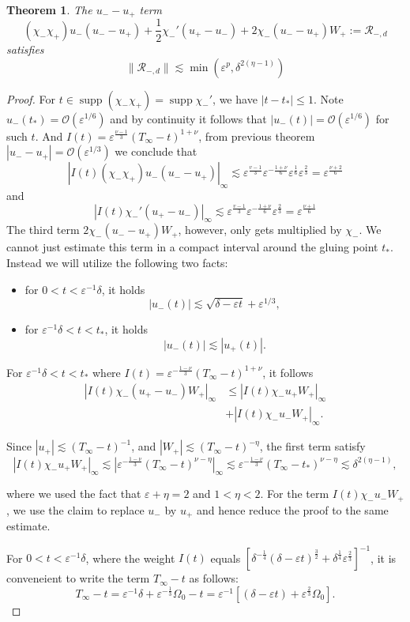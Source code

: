 \documentclass[letterpaper,11pt]{article}
\newcommand{\rmO}{\mathcal{O}}
\newcommand{\eps}{\varepsilon}
\newcommand{\lar}{ \lesssim }
\newcommand{\supp}{\operatorname{supp}}
\numberwithin{equation}{section}
\theoremstyle{plain}
\newtheorem{theorem}{Theorem}[section]
\begin{document}
\begin{enumerate}
\begin{itemize}
\begin{enumerate}
\begin{theorem}
The $u_--u_+$ term
\[
  (\chi_-\chi_+)u_-(u_--u_+) +\frac{1}{2}\chi_-'(u_+-u_-) + 2\chi_-(u_- -u_+)W_+ := \mathcal{R}_{-,d}
\]
satisfies
\[
\| \mathcal{R}_{-,d} \| \lar \min(\eps^{p}, \delta^{2(\eta-1)} )
\]
\end{theorem}
\begin{proof}
For $t\in \supp (\chi_-\chi_+) = \supp \chi_-'$, we have $|t-t_*| \le 1$. Note $u_-(t_*) = \rmO(\eps^{1/6})$ and by continuity it follows that $|u_-(t)| = \rmO(\eps^{1/6})$ for such $t$. And $I(t)=\eps^{\frac{\nu-1}{3}}(T_\infty-t)^{1+\nu}$, from previous theorem $|u_- - u_+| = \rmO(\eps^{1/3})$ we conclude that
\[
|I(t) (\chi_-\chi_+)u_-(u_--u_+)|_\infty \lar \eps^{\frac{v-1}{3}} \eps^{-\frac{1+\nu}{6}} \eps^{\frac{1}{6}}\eps^{\frac{2}{3}} = \eps^{\frac{\nu+2}{6}}
\]
 and
\[
|I(t) \chi_-'(u_+-u_-) |_\infty \lar\eps^{\frac{v-1}{3}} \eps^{-\frac{1+\nu}{6}} \eps^{\frac{2}{3}} = \eps^{\frac{\nu+1}{6}}
\]
 The third term $2\chi_-(u_- -u_+)W_+$, however, only gets multiplied by $\chi_-$. We cannot just estimate this term in a compact interval around the gluing point $t_*$. Instead we will utilize the following two facts:
\begin{itemize}
\item for $0<t<\eps^{-1}\delta$, it holds
\[
 |u_-(t)| \lar \sqrt{\delta-\eps t}+\eps^{1/3},
 \]
 \item for $\eps^{-1}\delta < t <t_*$, it holds
 \[
 |u_-(t)|\lar |u_+(t)|.
 \]
\end{itemize}

For $\eps^{-1}\delta<t<t_*$ where $I(t) = \eps^{-\frac{1-\nu}{3}} (T_\infty - t)^{1+\nu}$, it follows
\begin{align*}
|I(t)  \chi_-(u_+ - u_-)W_+|_\infty &\le |I(t) \chi_-u_+ W_+|_\infty\\
&+|I(t) \chi_-u_- W_+|_\infty.
\end{align*}
 
Since $|u_+| \lar (T_\infty -t)^{-1}$, and $|W_+| \lar (T_\infty-t)^{-\eta}$, the first term satisfy
\[
|I(t)\chi_-u_+ W_+|_\infty \lar |\eps^{-\frac{1-\nu}{3}} (T_\infty-t)^{\nu - \eta} |_\infty \lar \eps^{-\frac{1-\nu}{3}} (T_\infty-t_*)^{\nu - \eta} \lar \delta^{2(\eta-1)},
\]

where we used the fact that $\eps+\eta =2 $ and $1<\eta<2$. For the term $I(t)\chi_-u_-W_+$, we use the claim to replace $u_-$ by $u_+$ and hence reduce the proof to the same estimate.


For $0<t<\eps^{-1}\delta$, where the weight $I(t) $ equals $[\delta^{-\frac{1}{4}} (\delta -\eps t)^{\frac{3}{2}}+\delta^{\frac{1}{4}}\eps^{\frac{2}{3}}]^{-1}$, it is conveneient to write the term $T_\infty -t$ as follows:
\[
T_\infty -t = \eps^{-1}\delta + \eps^{-\frac{1}{3}}\Omega_0 - t  = \eps^{-1}\left[(\delta -\eps t) +\eps^{\frac{2}{3}}\Omega_0\right].
\]


\end{proof}
\end{enumerate}
\end{itemize}
\end{enumerate}
\end{document}
